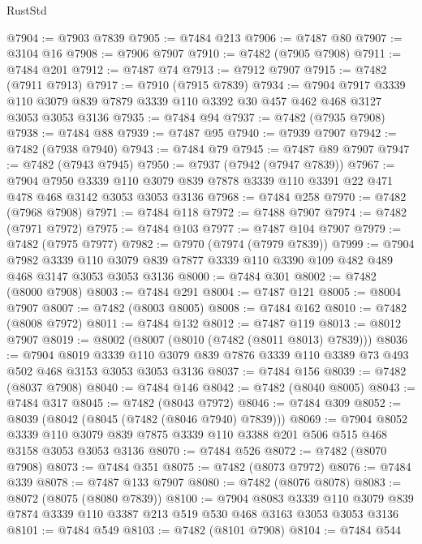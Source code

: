 \begin{lexlean}{RustStd}
\begin{coremodule}
@7904 := @7903 @7839
@7905 := @7484 @213
@7906 := @7487 @80
@7907 := @3104 @16
@7908 := @7906 @7907
@7910 := @7482 (@7905 @7908)
@7911 := @7484 @201
@7912 := @7487 @74
@7913 := @7912 @7907
@7915 := @7482 (@7911 @7913)
@7917 := @7910 (@7915 @7839)
@7934 := @7904
    @7917
    @3339
    @110
    @3079
    @839
    @7879
    @3339
    @110
    @3392
    @30
    @457
    @462
    @468
    @3127
    @3053
    @3053
    @3136
@7935 := @7484 @94
@7937 := @7482 (@7935 @7908)
@7938 := @7484 @88
@7939 := @7487 @95
@7940 := @7939 @7907
@7942 := @7482 (@7938 @7940)
@7943 := @7484 @79
@7945 := @7487 @89 @7907
@7947 := @7482 (@7943 @7945)
@7950 := @7937 (@7942 (@7947 @7839))
@7967 := @7904
    @7950
    @3339
    @110
    @3079
    @839
    @7878
    @3339
    @110
    @3391
    @22
    @471
    @478
    @468
    @3142
    @3053
    @3053
    @3136
@7968 := @7484 @258
@7970 := @7482 (@7968 @7908)
@7971 := @7484 @118
@7972 := @7488 @7907
@7974 := @7482 (@7971 @7972)
@7975 := @7484 @103
@7977 := @7487 @104 @7907
@7979 := @7482 (@7975 @7977)
@7982 := @7970 (@7974 (@7979 @7839))
@7999 := @7904
    @7982
    @3339
    @110
    @3079
    @839
    @7877
    @3339
    @110
    @3390
    @109
    @482
    @489
    @468
    @3147
    @3053
    @3053
    @3136
@8000 := @7484 @301
@8002 := @7482 (@8000 @7908)
@8003 := @7484 @291
@8004 := @7487 @121
@8005 := @8004 @7907
@8007 := @7482 (@8003 @8005)
@8008 := @7484 @162
@8010 := @7482 (@8008 @7972)
@8011 := @7484 @132
@8012 := @7487 @119
@8013 := @8012 @7907
@8019 := @8002 (@8007 (@8010 (@7482 (@8011 @8013) @7839)))
@8036 := @7904
    @8019
    @3339
    @110
    @3079
    @839
    @7876
    @3339
    @110
    @3389
    @73
    @493
    @502
    @468
    @3153
    @3053
    @3053
    @3136
@8037 := @7484 @156
@8039 := @7482 (@8037 @7908)
@8040 := @7484 @146
@8042 := @7482 (@8040 @8005)
@8043 := @7484 @317
@8045 := @7482 (@8043 @7972)
@8046 := @7484 @309
@8052 := @8039 (@8042 (@8045 (@7482 (@8046 @7940) @7839)))
@8069 := @7904
    @8052
    @3339
    @110
    @3079
    @839
    @7875
    @3339
    @110
    @3388
    @201
    @506
    @515
    @468
    @3158
    @3053
    @3053
    @3136
@8070 := @7484 @526
@8072 := @7482 (@8070 @7908)
@8073 := @7484 @351
@8075 := @7482 (@8073 @7972)
@8076 := @7484 @339
@8078 := @7487 @133 @7907
@8080 := @7482 (@8076 @8078)
@8083 := @8072 (@8075 (@8080 @7839))
@8100 := @7904
    @8083
    @3339
    @110
    @3079
    @839
    @7874
    @3339
    @110
    @3387
    @213
    @519
    @530
    @468
    @3163
    @3053
    @3053
    @3136
@8101 := @7484 @549
@8103 := @7482 (@8101 @7908)
@8104 := @7484 @544

\end{coremodule}
\end{lexlean}
